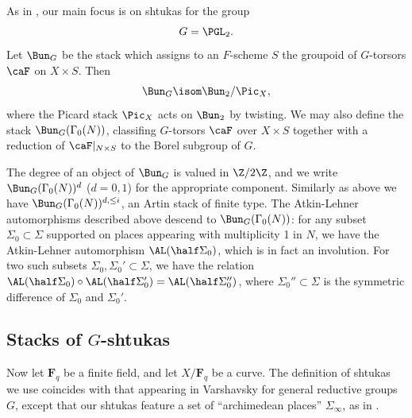 \documentclass{article}
\def\F{\mathbf{F}}
\begin{document}
As in \cite{YunZhangShtukas}, our main focus is on shtukas for the group
\[ G = \PGL_2.\]
Let $\Bun_G$ be the stack which assigns to an $F$-scheme $S$ the groupoid of $G$-torsors $\caF$ on $X\times S$.  Then 
\[ \Bun_G \isom \Bun_2/\Pic_X,\]
where the Picard stack $\Pic_X$ acts on $\Bun_2$ by twisting.   We may also define the stack $\Bun_G(\Gamma_0(N))$, classifing $G$-torsors $\caF$ over $X\times S$ together with a reduction of $\caF\vert_{N\times S}$ to the Borel subgroup of $G$.

The degree of an object of $\Bun_G$ is valued in $\Z/2\Z$, and we write $\Bun_G(\Gamma_0(N))^d$ ($d=0,1$) for the appropriate component.   Similarly as above we have $\Bun_G(\Gamma_0(N))^{d,\leq i}$, an Artin stack of finite type.  The Atkin-Lehner automorphisms described above descend to $\Bun_G(\Gamma_0(N))$:  for any subset $\Sigma_0\subset \Sigma$ supported on places appearing with multiplicity 1 in $N$, we have the Atkin-Lehner automorphism $\AL(\half \Sigma_0)$, which is in fact an involution.  For two such subsets $\Sigma_0,\Sigma_0'\subset \Sigma$, we have the relation $\AL(\half \Sigma_0)\circ \AL(\half\Sigma_0') = \AL(\half \Sigma_0'')$, where $\Sigma_0''\subset \Sigma$ is the symmetric difference of $\Sigma_0$ and $\Sigma_0'$.


\subsection{Stacks of $G$-shtukas}
Now let $\F_q$ be a finite field, and let $X/\F_q$ be a curve.   The definition of shtukas we use coincides with that appearing in Varshavsky \cite{Varshavsky} for general reductive groups $G$, except that our shtukas feature a set of ``archimedean places'' $\Sigma_\infty$, as in \cite{YunZhangShtukasII}.   
\end{document}
